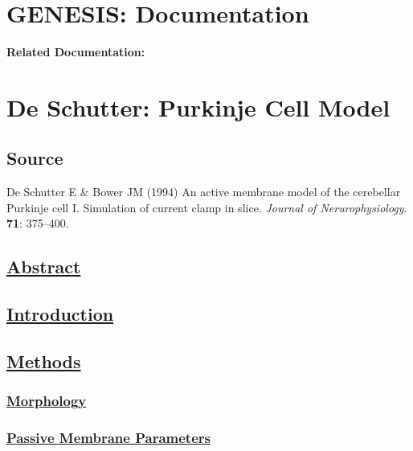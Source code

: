 \documentclass[12pt]{article}
\begin{document}
\section*{GENESIS: Documentation}

{\bf Related Documentation:}

\section*{De Schutter: Purkinje Cell Model}

\subsection*{Source}

De Schutter E \& Bower JM (1994) An active membrane model of the cerebellar Purkinje cell I. Simulation of current clamp in slice. {\it Journal of Nerurophysiology}. {\bf 71}: 375--400.

\subsection*{\href{../pub-purkinje-deschutter-abstract/pub-purkinje-deschutter-abstract.tex}{\bf Abstract}}

\subsection*{\href{../pub-purkinje-deschutter-introduction/pub-purkinje-deschutter-introduction.tex}{\bf Introduction}}

\subsection*{\href{../pub-purkinje-deschutter-methods/pub-purkinje-deschutter-methods.tex}{\bf Methods}}

\subsubsection*{\href{../pub-purkinje-deschutter-morphology/pub-purkinje-deschutter-morphology.tex}{\bf Morphology}}

\subsubsection*{\href{../pub-purkinje-deschutter-passive/pub-purkinje-deschutter-passive.tex}{\bf Passive Membrane Parameters}}
\end{document}
